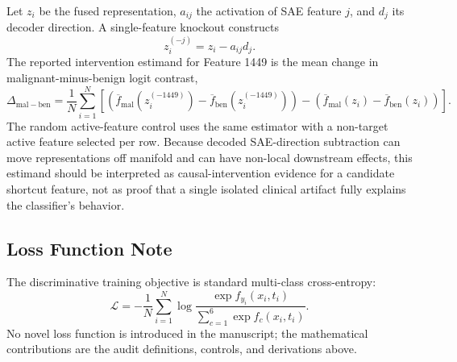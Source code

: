 \documentclass[10pt]{article}
\begin{document}
Let $z_i$ be the fused representation, $a_{ij}$ the activation of SAE feature
$j$, and $d_j$ its decoder direction. A single-feature knockout constructs
\[
z_i^{(-j)}=z_i-a_{ij}d_j.
\]
The reported intervention estimand for Feature 1449 is the mean change in
malignant-minus-benign logit contrast,
\[
\Delta_{\mathrm{mal-ben}}=
\frac{1}{N}\sum_{i=1}^N
\left[
\left(\overline{f}_{\mathrm{mal}}(z_i^{(-1449)})
-\overline{f}_{\mathrm{ben}}(z_i^{(-1449)})\right)
-
\left(\overline{f}_{\mathrm{mal}}(z_i)
-\overline{f}_{\mathrm{ben}}(z_i)\right)
\right].
\]
The random active-feature control uses the same estimator with a non-target
active feature selected per row. Because decoded SAE-direction subtraction can
move representations off manifold and can have non-local downstream effects,
this estimand should be interpreted as causal-intervention evidence for a
candidate shortcut feature, not as proof that a single isolated clinical artifact
fully explains the classifier's behavior.

\subsection*{Loss Function Note}

The discriminative training objective is standard multi-class cross-entropy:
\[
\mathcal{L}=-\frac{1}{N}\sum_{i=1}^N \log
\frac{\exp f_{y_i}(x_i,t_i)}{\sum_{c=1}^{6}\exp f_c(x_i,t_i)}.
\]
No novel loss function is introduced in the manuscript; the mathematical
contributions are the audit definitions, controls, and derivations above.
\end{document}
